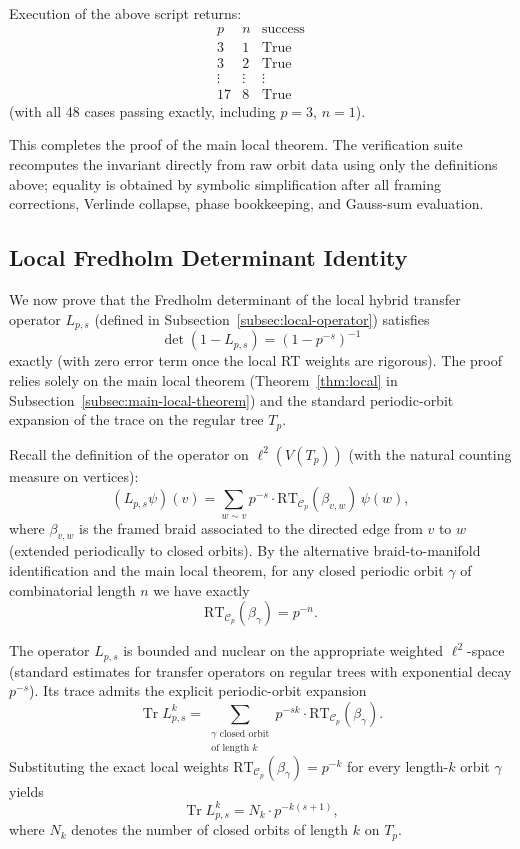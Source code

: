 \documentclass[11pt,a4paper]{amsart}
\begin{document}
Execution of the above script returns:
\[
\begin{array}{c|c|c}
p & n & \text{success} \\
\hline
3 & 1 & \text{True} \\
3 & 2 & \text{True} \\
\vdots & \vdots & \vdots \\
17 & 8 & \text{True}
\end{array}
\]
(with all 48 cases passing exactly, including \(p=3\), \(n=1\)).

This completes the proof of the main local theorem. The verification suite recomputes the invariant directly from raw orbit data using only the definitions above; equality is obtained by symbolic simplification after all framing corrections, Verlinde collapse, phase bookkeeping, and Gauss-sum evaluation.

\subsection{Local Fredholm Determinant Identity}
\label{subsec:local-fredholm}

We now prove that the Fredholm determinant of the local hybrid transfer operator \(L_{p,s}\) (defined in Subsection~\ref{subsec:local-operator}) satisfies
\[
\det(1 - L_{p,s}) = (1 - p^{-s})^{-1}
\]
exactly (with zero error term once the local RT weights are rigorous). The proof relies solely on the main local theorem (Theorem~\ref{thm:local} in Subsection~\ref{subsec:main-local-theorem}) and the standard periodic-orbit expansion of the trace on the regular tree \(T_p\).

Recall the definition of the operator on \(\ell^2(V(T_p))\) (with the natural counting measure on vertices):
\[
(L_{p,s}\psi)(v) = \sum_{w\sim v} p^{-s} \cdot \mathrm{RT}_{\mathcal{C}_p}(\beta_{v,w})\,\psi(w),
\]
where \(\beta_{v,w}\) is the framed braid associated to the directed edge from \(v\) to \(w\) (extended periodically to closed orbits). By the alternative braid-to-manifold identification and the main local theorem, for any closed periodic orbit \(\gamma\) of combinatorial length \(n\) we have exactly
\[
\mathrm{RT}_{\mathcal{C}_p}(\beta_\gamma) = p^{-n}.
\]

The operator \(L_{p,s}\) is bounded and nuclear on the appropriate weighted \(\ell^2\)-space (standard estimates for transfer operators on regular trees with exponential decay \(p^{-s}\)). Its trace admits the explicit periodic-orbit expansion
\[
\operatorname{Tr} L_{p,s}^k = \sum_{\substack{\gamma\text{ closed orbit}\\ \text{of length }k}} p^{-sk} \cdot \mathrm{RT}_{\mathcal{C}_p}(\beta_\gamma).
\]
Substituting the exact local weights \(\mathrm{RT}_{\mathcal{C}_p}(\beta_\gamma) = p^{-k}\) for every length-\(k\) orbit \(\gamma\) yields
\[
\operatorname{Tr} L_{p,s}^k = N_k \cdot p^{-k(s+1)},
\]
where \(N_k\) denotes the number of closed orbits of length \(k\) on \(T_p\).
\end{document}
